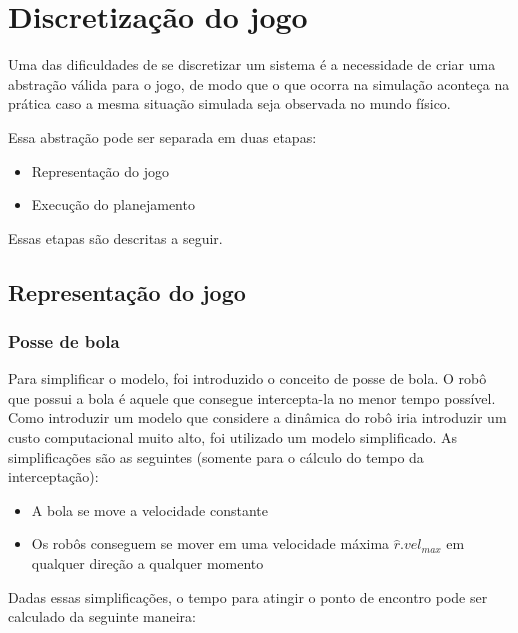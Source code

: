 \section{Discretização do jogo}\label{sec:mapeamento}

Uma das dificuldades de se discretizar um sistema é a necessidade de criar uma
abstração válida para o jogo, de modo que o que ocorra na simulação aconteça na
prática caso a mesma situação simulada seja observada no mundo físico.

Essa abstração pode ser separada em duas etapas:

\begin{itemize}
  \item Representação do jogo
  \item Execução do planejamento
\end{itemize}

Essas etapas são descritas a seguir.

\subsection{Representação do jogo}\label{subsec:repres_jogo}

\subsubsection{Posse de bola}

Para simplificar o modelo, foi introduzido o conceito de posse de bola. O robô
que possui a bola é aquele que consegue intercepta-la no menor tempo possível.
Como introduzir um modelo que considere a dinâmica do robô iria introduzir um
custo computacional muito alto, foi utilizado um modelo simplificado. As
simplificações são as seguintes (somente para o cálculo do tempo da
interceptação):

\begin{itemize}
  \item A bola se move a velocidade constante
  \item Os robôs conseguem se mover em uma velocidade máxima
        $\hat{r}.vel_{max}$ em qualquer direção a qualquer momento
\end{itemize}

Dadas essas simplificações, o tempo para atingir o ponto de encontro pode ser
calculado da seguinte maneira:


